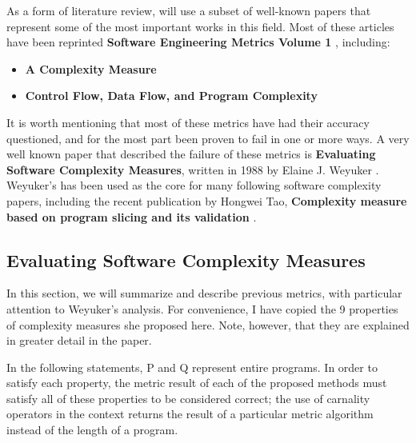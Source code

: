 \documentclass[]{article}
\begin{document}

As a form of literature review, will use a subset of well-known papers that represent some of the most important works in this field.
Most of these articles have been reprinted \textbf{Software Engineering Metrics Volume 1} \cite{sheppherd1993complexity}, including:
\begin{itemize}
	\item \textbf{A Complexity Measure} \cite{ref:a_complexity_measure}
	\item \textbf{Control Flow, Data Flow, and Program Complexity} \cite{ref:oviedo1993control}
\end{itemize}

It is worth mentioning that most of these metrics have had their accuracy questioned, and for the most part been proven to fail in one or more ways.
A very well known paper that described the failure of these metrics is \textbf{Evaluating Software Complexity Measures}, written in 1988 by Elaine J. Weyuker \cite{ref:evaluating_software_complexity_measures}.
Weyuker's has been used as the core for many following software complexity papers, including the recent publication by Hongwei Tao, \textbf{Complexity measure based on program slicing and its validation} \cite{ref:tao2014complexity}.



\subsection{Evaluating Software Complexity Measures}


In this section, we will summarize and describe previous metrics, with particular attention to Weyuker's analysis.
For convenience, I have copied the 9 properties of complexity measures she proposed here. 
Note, however, that they are explained in greater detail in the paper.

In the following statements, P and Q represent entire programs.
In order to satisfy each property, the metric result of each of the proposed methods must satisfy all of these properties to be considered correct; the use of carnality operators in the context returns the result of a particular metric algorithm instead of the length of a program.
\end{document}
